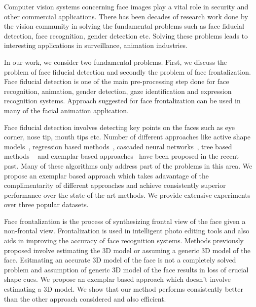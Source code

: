 Computer vision systems concerning face images play a vital role in security and other commercial applications. 
There has been decades of research work done by the vision community in solving the fundamental problems
such as face fiducial detection, face recognition, gender detection etc. Solving these problems
leads to interesting applications in surveillance, animation industries. 

In our work, we consider two fundamental problems. First, we discuss the problem of face fiducial
detection and secondly the problem of face frontalization. Face fiducial detection is one of 
the main pre-processing step done for face recognition, animation, gender detection, gaze identification
and expression recognition systems. Approach suggested for face frontalization can be used in many of the 
facial animation application.

Face fiducial detection involves detecting key points on the faces such as eye corner, nose tip, mouth tips
etc. Number of different approaches like active shape models~\cite{milborrowCVPR08_ASM}, regression based 
methods~\cite{yuECCV14_CoR}, cascaded neural networks~\cite{zhangECCV14_deepfacealign}, tree based methods
~\cite{xhuCVPR12_wild} and exemplar based approaches~\cite{kumarPAMI13_faceExem} have been proposed in the 
recent past. Many of these algorithms only address part of the problems in this area. We propose an 
exemplar based approach which takes adavantage of the complimentarity of different approaches and achieve
consistently superior performance over the state-of-the-art methods. We provide extensive experiments 
over three popular datasets.

Face frontalization is the process of synthesizing frontal view of the face given a non-frontal view. 
Frontalization is used in intelligent photo editing tools and also aids in improving the accuracy of face
 recognition systems. Methods previously proposed involve estimating the 3D model or assuming a generic
3D model of the face. Esitmating an accurate 3D model of the face is not a completely solved problem and 
assumption of generic 3D model of the face results in loss of crucial shape cues. We propose an exemplar
based approach which doesn't involve estimating a 3D model. We show that our method performs consistently
better than the other approach considered and also efficient.

